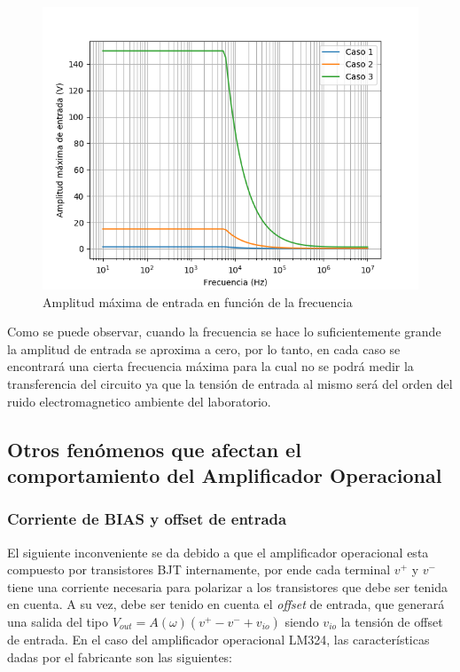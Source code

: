 \begin{figure}[H]
\begin{centering}
\includegraphics[scale=0.5]{../Ex1/iA/Resources1a/AmplMaxVsFreq123}
\par\end{centering}
\caption{Amplitud máxima de entrada en función de la frecuencia}

\end{figure}

Como se puede observar, cuando la frecuencia se hace lo suficientemente
grande la amplitud de entrada se aproxima a cero, por lo tanto, en
cada caso se encontrará una cierta frecuencia máxima para la cual
no se podrá medir la transferencia del circuito ya que la tensión
de entrada al mismo será del orden del ruido electromagnetico ambiente
del laboratorio.

\subsection{Otros fenómenos que afectan el comportamiento del Amplificador Operacional}

\subsubsection{Corriente de BIAS y offset de entrada}

El siguiente inconveniente se da debido a que el amplificador operacional
esta compuesto por transistores BJT internamente, por ende cada terminal
$v^{+}$ y $v^{-}$ tiene una corriente necesaria para polarizar a
los transistores que debe ser tenida en cuenta. A su vez, debe ser
tenido en cuenta el \emph{offset} de entrada, que generará una salida
del tipo $V_{out}=A(\omega)\left(v^{+}-v^{-}+v_{io}\right)$ siendo
$v_{io}$ la tensión de offset de entrada. En el caso del amplificador
operacional LM324, las características dadas por el fabricante son
las siguientes:

